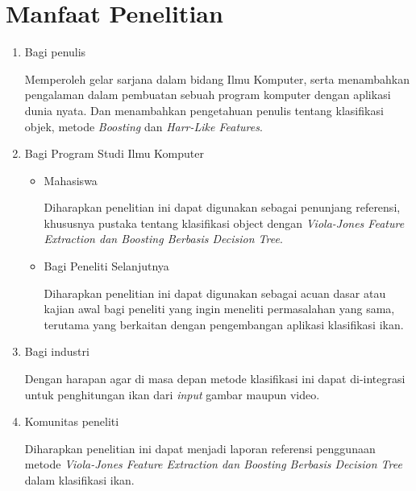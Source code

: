 \section{Manfaat Penelitian}
\begin{enumerate}
	\item Bagi penulis
		
	Memperoleh gelar sarjana dalam bidang Ilmu Komputer, serta menambahkan 
	pengalaman dalam pembuatan sebuah program komputer dengan aplikasi dunia 
	nyata. Dan menambahkan pengetahuan penulis tentang klasifikasi objek, metode 
	\textit{Boosting} dan \textit{Harr-Like Features}.
		
	\item Bagi Program Studi Ilmu Komputer
	
	\begin{itemize}
		\item Mahasiswa
		
		Diharapkan penelitian ini dapat digunakan sebagai penunjang referensi, 
		khususnya pustaka tentang klasifikasi object dengan 
		\textit{Viola-Jones Feature Extraction dan Boosting Berbasis 
		Decision Tree}.

		\item Bagi Peneliti Selanjutnya
		
		Diharapkan penelitian ini dapat digunakan sebagai acuan dasar atau kajian 
		awal bagi peneliti yang ingin meneliti permasalahan yang sama, terutama 
		yang berkaitan dengan pengembangan aplikasi klasifikasi ikan.

	\end{itemize}

	\item Bagi industri
	
	Dengan harapan agar di masa depan metode klasifikasi ini dapat di-integrasi 
	untuk penghitungan ikan dari \textit{input} gambar maupun video.

	\item Komunitas peneliti
	
	Diharapkan penelitian ini dapat menjadi laporan 
	referensi penggunaan metode \textit{Viola-Jones Feature Extraction dan Boosting Berbasis 
	Decision Tree} dalam klasifikasi ikan.



			
\end{enumerate}

\begin{comment}

\end{comment}
